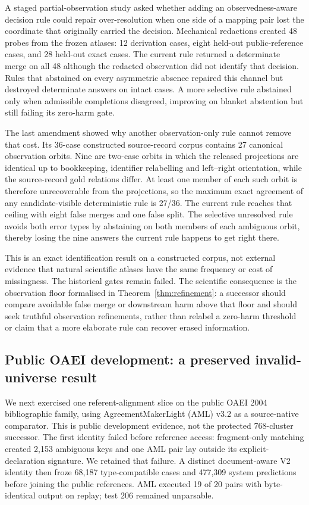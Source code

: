 A staged partial-observation study asked whether adding an observedness-aware
decision rule could repair over-resolution when one side of a mapping pair
lost the coordinate that originally carried the decision. Mechanical
redactions created 48 probes from the frozen atlases: 12 derivation cases,
eight held-out public-reference cases, and 28 held-out exact cases. The current
rule returned a determinate merge on all 48 although the redacted observation
did not identify that decision. Rules that abstained on every asymmetric
absence repaired this channel but destroyed determinate answers on intact
cases. A more selective rule abstained only when admissible completions
disagreed, improving on blanket abstention but still failing its zero-harm
gate.

The last amendment showed why another observation-only rule cannot remove that
cost. Its 36-case constructed source-record corpus contains 27 canonical
observation orbits. Nine are two-case orbits in which the released projections
are identical up to bookkeeping, identifier relabelling and left--right
orientation, while the source-record gold relations differ. At least one
member of each such orbit is therefore unrecoverable from the projections, so
the maximum exact agreement of any candidate-visible deterministic rule is
27/36. The current rule reaches that ceiling with eight false merges and one
false split. The selective unresolved rule avoids both error types by
abstaining on both members of each ambiguous orbit, thereby losing the nine
answers the current rule happens to get right there.

This is an exact identification result on a constructed corpus, not external
evidence that natural scientific atlases have the same frequency or cost of
missingness. The historical gates remain failed. The scientific consequence
is the observation floor formalised in Theorem~\ref{thm:refinement}: a
successor should compare avoidable false merge or downstream harm above that
floor and should seek truthful observation refinements, rather than relabel a
zero-harm threshold or claim that a more elaborate rule can recover erased
information.

\subsection{Public OAEI development: a preserved invalid-universe result}

We next exercised one referent-alignment slice on the public OAEI 2004
bibliographic family, using AgreementMakerLight (AML) v3.2 as a source-native
comparator.  This is public development evidence, not the protected
768-cluster successor.  The first identity failed before reference access:
fragment-only matching created 2,153 ambiguous keys and one AML pair lay
outside its explicit-declaration signature.  We retained that failure.  A
distinct document-aware V2 identity then froze 68,187 type-compatible cases
and 477,309 system predictions before joining the public references.  AML
executed 19 of 20 pairs with byte-identical output on replay; test 206 remained
unparsable.

